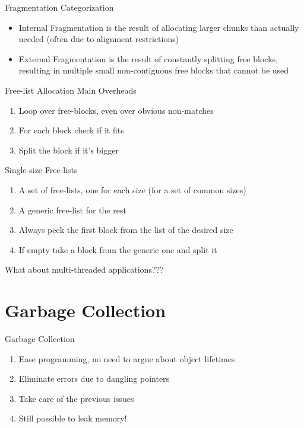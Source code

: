 \documentclass[
14pt,
aspectratio=169,
usenames,
dvipsnames,
x11names]{beamer}
\begin{document}
\begin{frame}{Fragmentation Categorization}
  \begin{itemize}  \setlength{\itemsep}{\fill}
  \item \alert{Internal Fragmentation} is the result of allocating larger chunks than actually needed (often due to alignment restrictions)
  \item \alert{External Fragmentation} is the result of constantly splitting free blocks, resulting in multiple small non-contiguous free blocks that cannot be used
  \end{itemize}
\end{frame}


\begin{frame}{Free-list Allocation Main Overheads}
  \begin{enumerate}  \setlength{\itemsep}{\fill}
  \item Loop over free-blocks, even over obvious non-matches
  \item For each block check if it fits
  \item Split the block if it's bigger
  \end{enumerate}
\end{frame}

\begin{frame}{Single-size Free-lists}
  \begin{enumerate}  \setlength{\itemsep}{\fill}
  \item A set of free-lists, one for each size (for a set of common sizes)
  \item A generic free-list for the rest
  \item Always peek the first block from the list of the desired size
  \item If empty take a block from the generic one and split it
  \end{enumerate}
\end{frame}

\begin{frame}
  \centering
  What about \alert{multi-threaded} applications???
\end{frame}

\section{Garbage Collection}

\begin{frame}{Garbage Collection}
  \begin{enumerate}  \setlength{\itemsep}{\fill}
  \item Ease programming, no need to argue about object lifetimes
  \item Eliminate errors due to dangling pointers
  \item Take care of the previous issues
  \item Still possible to leak memory!
  \end{enumerate}
\end{frame}
\end{document}
